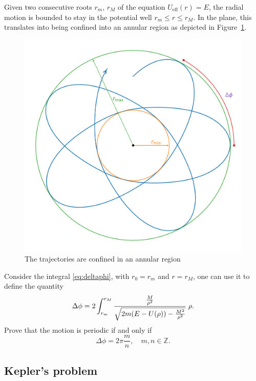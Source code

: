 \documentclass[english,fontsize=11pt,paper=a5,oneside]{scrbook}
\newcommand{\Z}{\mathbb{Z}}
\let\d\relax
\DeclareMathOperator{\d}{d}
\theoremstyle{definition}
\newenvironment{exercise}
  {\pushQED{\qed}\renewcommand{\qedsymbol}{$\maltese$}\exercisex}
  {\popQED\endexercisex}
\begin{document}
Given two consecutive roots $r_m$, $r_M$ of the equation $U_{\mathrm{eff}}(r) = E$, the radial motion is bounded to stay in the potential well $r_m \leq r \leq r_M$.
In the plane, this translates into being confined into an annular region as depicted in Figure~\ref{fig:annregio}.

\begin{figure}[ht]
    \centering
    \includegraphics[width=0.5\linewidth]{images/annular-region.pdf}
    \caption{The trajectories are confined in an annular region \cite{book:ll}}
    \label{fig:annregio}
\end{figure}

\begin{exercise}
    Consider the integral \eqref{eq:deltaphi}, with $r_0 = r_m$ and $r = r_M$, one can use it to define the quantity
    \begin{equation}\label{eq:Dektaphi}
        \Delta \phi = 2\int_{r_m}^{r_M} \frac{\frac{M}{\rho^2}}{\sqrt{2m(E-U(\rho)) - \frac{M^2}{\rho^2}}}\;\d \rho.
    \end{equation}
    Prove that the motion is periodic if and only if
    \begin{equation}
        \Delta \phi = 2\pi \frac mn, \quad m,n\in\Z.
    \end{equation}
\end{exercise}

\subsection{Kepler's problem}
\end{document}
